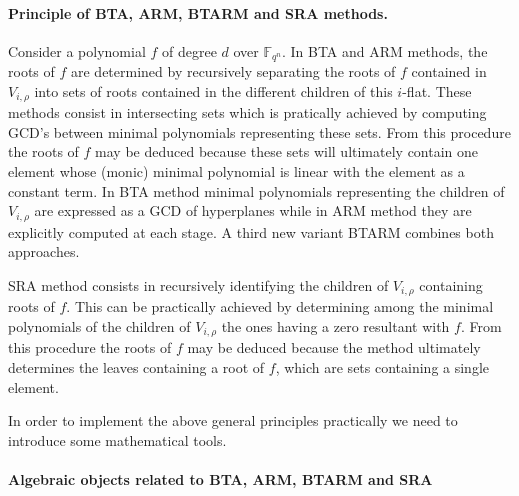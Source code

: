\documentclass{article}
\newcommand{\ff}[1]{\mathbb{F}_{#1}}
\newcommand{\dd}{d}
\newcommand{\qq}{q}
\newcommand{\nn}{n}
\newcommand{\qn}{{\qq^\nn}}
\newcommand{\extf}{\ff{\qn}}
\begin{document}
\paragraph{Principle of BTA, ARM, BTARM and SRA methods.} Consider a polynomial $f$ of degree $\dd$ over $\extf$. In BTA and ARM methods, the roots of $f$ are determined by recursively separating the roots of $f$ contained in $V_{i,\rho}$ into sets of roots contained in the different children of this $i$-flat. These methods consist in intersecting sets which is pratically achieved by computing GCD's between minimal polynomials representing these sets. From this procedure the roots of $f$ may be deduced because 
these sets will ultimately contain one element whose (monic) minimal polynomial is linear with the element as a constant term. In BTA method minimal polynomials representing the children of $V_{i,\rho}$
are expressed as a GCD of hyperplanes while in ARM method they are explicitly computed at each stage. A third new variant BTARM combines both approaches.

\medskip
 
SRA method consists in recursively identifying the children of $V_{i,\rho}$ containing roots of $f$. 
This can be practically achieved by determining among the minimal polynomials of the children of 
$V_{i,\rho}$ the ones having a zero resultant with $f$. %
From this procedure the roots of $f$ may be deduced because the method ultimately determines the leaves containing a root of $f$, which are sets containing a single element.

In order to implement the above general principles practically we need to introduce some 
mathematical tools.


\paragraph{Algebraic objects related to BTA, ARM, BTARM and SRA}
\end{document}
